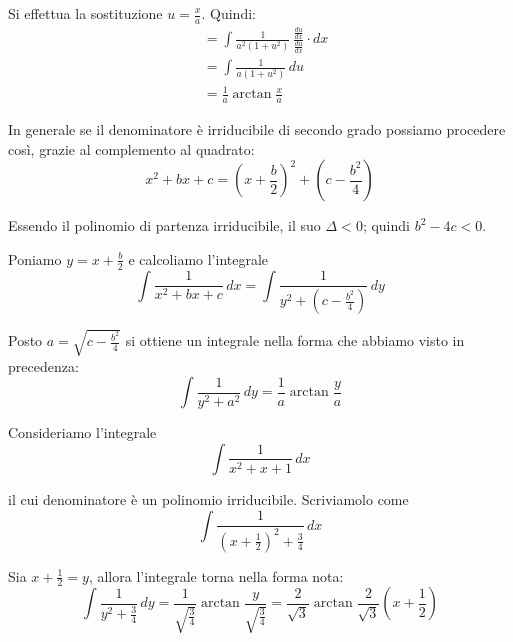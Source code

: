 Si effettua la sostituzione $u = \frac{x}{a}$. Quindi:
\begin{align*}
&= \int \frac{1}{a^2(1+u^2)} \, \frac{\frac{du}{dx}}{\frac{du}{dx}} \cdot dx \\
&= \int \frac{1}{a(1+u^2)} \, du \\
&= \frac{1}{a} \arctan \frac{x}{a}
\end{align*}

\begin{remark}
In generale se il denominatore è irriducibile di secondo grado possiamo procedere così, grazie al complemento al quadrato:
\begin{equation*}
x^2+bx+c = \left(x+\frac{b}{2} \right)^2 + \left(c-\frac{b^2}{4} \right)
\end{equation*}

Essendo il polinomio di partenza irriducibile, il suo $\Delta < 0$; quindi $b^2 - 4c < 0$. 

Poniamo $y = x + \frac{b}{2}$ e calcoliamo l'integrale
\begin{equation*}
\int \frac{1}{x^2+bx+c} \, dx = \int \frac{1}{y^2 + (c-\frac{b^2}{4})} \, dy
\end{equation*}

Posto $a = \sqrt{c-\frac{b^2}{4}}$ si ottiene un integrale nella forma che abbiamo visto in precedenza:
\begin{equation*}
\int \frac{1}{y^2+a^2} \, dy = \frac{1}{a} \arctan \frac{y}{a}
\end{equation*}
\end{remark}

\begin{example}
Consideriamo l'integrale
\begin{equation*}
\int \frac{1}{x^2+x+1} \, dx
\end{equation*}

il cui denominatore è un polinomio irriducibile. Scriviamolo come
\begin{equation*}
\int \frac{1}{(x+\frac{1}{2})^2 + \frac{3}{4}} \, dx
\end{equation*}
\end{example}

Sia $x+\frac{1}{2} = y$, allora l'integrale torna nella forma nota:
\begin{equation*}
\int \frac{1}{y^2+\frac{3}{4}} \, dy = \frac{1}{\sqrt{\frac{3}{4}}} \arctan \frac{y}{\sqrt{\frac{3}{4}}} = \frac{2}{\sqrt{3}} \arctan \frac{2}{\sqrt{3}} \left(x + \frac{1}{2}\right)
\end{equation*}

